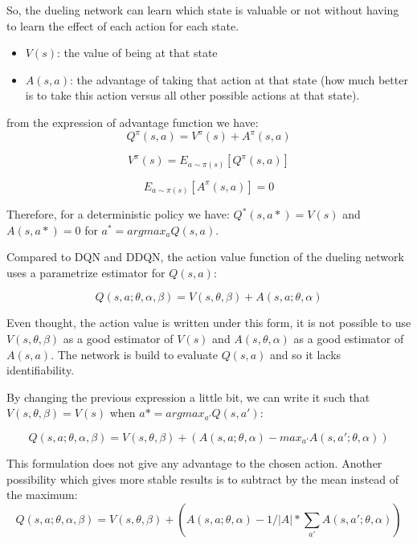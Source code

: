 \documentclass[12pt]{article}
\begin{document}
So, the dueling network can learn which state is valuable or not without having to learn the effect of each action for each state.
\begin{itemize}
\item $V(s)$: the value of being at that state
\item $A(s,a)$: the advantage of taking that action at that state (how much better is to take this action versus all other possible actions at that state).
\end{itemize}

from the expression of advantage function we have:
\begin{equation}
	Q^{\pi}(s,a)=V^\pi (s) +A^\pi (s,a)
\end{equation}

\begin{equation}
	V^\pi (s)=E_{a \sim \pi(s)}[Q^\pi (s,a)]
\end{equation}

\begin{equation}
	E_{a \sim \pi(s)}[A^\pi (s,a)]=0
\end{equation}

Therefore, for a deterministic policy we have: $Q^*(s,a*)=V(s)$ and $A(s,a*)=0$ for $a^{*}=argmax_a Q(s,a)$.

Compared to DQN and DDQN, the action value function of the dueling network uses a parametrize estimator for $Q(s,a)$:

\begin{equation}
	Q(s,a;\theta,\alpha,\beta)=V(s,\theta,\beta) +A(s,a;\theta,\alpha)
\end{equation}

Even thought, the action value is written under this form, it is not possible to use $V(s,\theta,\beta)$ as a good estimator of $V(s)$ and $A(s,\theta,\alpha)$ as a good estimator of $A(s,a)$. 
The network is build to evaluate $Q(s,a)$ and so it lacks identifiability.

By changing the previous expression a little bit, we can write it such that $V(s,\theta,\beta)=V(s)$ when $a*=argmax_{a'}Q(s,a')$:

\begin{equation}
	Q(s,a;\theta,\alpha,\beta)=V(s,\theta,\beta) +(A(s,a;\theta,\alpha)-max_{a'}A(s,a';\theta,\alpha))
\end{equation}

This formulation does not give any advantage to the chosen action. 
Another possibility which gives more stable results is to subtract by the mean instead of the maximum:
\begin{equation}
	Q(s,a;\theta,\alpha,\beta)=V(s,\theta,\beta) +(A(s,a;\theta,\alpha)-1/{|A|}*\sum_{a'} A(s,a';\theta,\alpha))
\end{equation}
\end{document}
